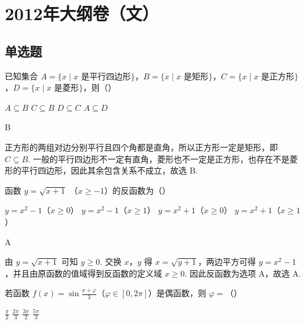 \chapter{2012年大纲卷（文）}

\section{单选题}

\begin{problem}
已知集合 \(A = \{x \mid x\text{ 是平行四边形}\}\)，\(B = \{x \mid x\text{ 是矩形}\}\)，\(C = \{x \mid x\text{ 是正方形}\}\)，\(D = \{x \mid x\text{ 是菱形}\}\)，则（\quad）

\choices
    {\(A \subseteq B\)}
    {\(C \subseteq B\)}
    {\(D \subseteq C\)}
    {\(A \subseteq D\)}
\end{problem}

\begin{answer}
B
\end{answer}

\begin{solution}
正方形的两组对边分别平行且四个角都是直角，所以正方形一定是矩形，即 \(C\subseteq B\). 一般的平行四边形不一定有直角，菱形也不一定是正方形，也存在不是菱形的平行四边形，因此其余包含关系不成立，故选 B.
\end{solution}

\begin{problem}
函数 \( y = \sqrt{x + 1} \) （\(x \geqslant -1\)）的反函数为（\quad）

\choices
    {\( y = x^{2} - 1 \)（\(x \geqslant 0\)）}
    {\( y = x^{2} - 1 \)（\(x \geqslant 1\)）}
    {\( y = x^{2} + 1 \)（\(x \geqslant 0\)）}
    {\( y = x^{2} + 1 \)（\(x \geqslant 1\)）}
\end{problem}

\begin{answer}
A
\end{answer}

\begin{solution}
由 \(y=\sqrt{x+1}\) 可知 \(y\geqslant0\). 交换 \(x\)，\(y\) 得 \(x=\sqrt{y+1}\)，两边平方可得 \(y=x^{2}-1\)，并且由原函数的值域得到反函数的定义域 \(x\geqslant0\). 因此反函数为选项 A，故选 A.
\end{solution}

\begin{problem}
若函数 \( f(x) = \sin \frac{x + \varphi}{3} \)（\(\varphi \in [0, 2\pi]\)）是偶函数，则 \( \varphi = \)（\quad）

\choices
    {\(\frac{\pi}{2}\)}
    {\(\frac{2\pi}{3}\)}
    {\(\frac{3\pi}{2}\)}
    {\(\frac{5\pi}{3}\)}
\end{problem}

